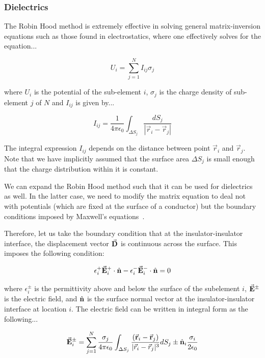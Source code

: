 \subsubsection{Dielectrics}

The Robin Hood method is extremely effective in solving general matrix-inversion equations such as those found in electrostatics, where one effectively solves for the equation...

\begin{equation}
U_i = \sum_{j=1}^N I_{ij} \sigma_j
\end{equation}

\noindent where $U_i$ is the potential of the sub-element $i$, $\sigma_j$ is the charge density of sub-element $j$ of $N$ and $I_{ij}$ is given by...

\begin{equation}
I_{ij} = \frac{1}{4\pi\epsilon_0}\int_{\Delta S_j} \frac{dS_j}{|\vec{r}_i - \vec{r}_j|} 
\end{equation}

The integral expression $I_{ij}$ depends on the distance between point $\vec{r}_i$ and $\vec{r}_j$.  Note that we have implicitly assumed that the surface area $\Delta S_j$ is small enough that the charge distribution within it is constant.

We can expand the Robin Hood method such that it can be used for dielectrics as well.  In the latter case, we need to modify the matrix equation to deal not with potentials (which are fixed at the surface of a conductor) but the boundary conditions imposed by Maxwell's equations~\cite{Rao}.

Therefore, let us take the boundary condition that at the insulator-insulator interface, the displacement vector $\vec{\bf D}$ is continuous across the surface.  This imposes the following condition:

\begin{equation}
\epsilon_i^+ \vec{\bf E}^+_i \cdot \hat{\bf n} - \epsilon_i^- \vec{\bf E}^-_i \cdot \hat{\bf n} = 0
\end{equation} 

\noindent where $\epsilon^{\pm}_i$ is the permittivity above and below the surface of the subelement $i$, $\vec{\bf E}^\pm$ is the electric field, and $\hat{\bf n}$ is the surface normal vector at the insulator-insulator interface at location $i$.  The electric field can be written in integral form as the following...

\begin{equation}
\vec{\bf E}^{\pm}_i = \sum_{j=1}^{N} \frac{\sigma_j}{4\pi\epsilon_0}\int_{\Delta S_j} \frac{(\vec{\bf r}_i - \vec{\bf r}_j)}{|\vec{r}_i - \vec{r}_j|^3} dS_j \pm \hat{\bf n}_i \frac{\sigma_i}{2 \epsilon_0}
\end{equation}

